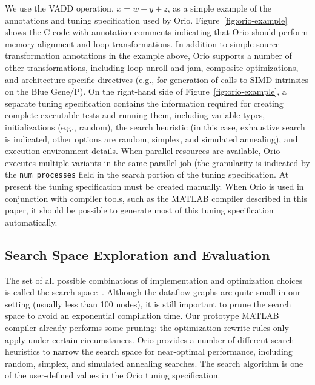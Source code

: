 \documentclass[11pt]{article}
\begin{document}
We use the VADD operation, $x = w + y + z$, as a simple example of the annotations and tuning specification used by Orio. Figure~\ref{fig:orio-example} shows the C code with annotation comments indicating that Orio should perform memory alignment and loop transformations. In addition to simple source transformation annotations in the example above, Orio supports a number of other transformations, including loop unroll and jam, composite optimizations, and architecture-specific directives (e.g., for generation of calls to SIMD intrinsics on the Blue Gene/P). On the right-hand side of Figure~\ref{fig:orio-example}, a separate tuning specification contains the information required for creating complete executable tests and running them, including variable types, initializations (e.g., random), the search heuristic (in this case, exhaustive search is indicated, other options are random, simplex, and simulated annealing), and execution environment details. When parallel resources are available, Orio executes multiple variants in the same parallel job (the granularity is indicated by the \texttt{num\_processes} field in the search portion of the tuning specification. At present the tuning specification must be created manually. When Orio is used in conjunction with compiler tools, such as the MATLAB compiler described in this paper, it should be possible to generate most of this tuning specification automatically.

\subsection{Search Space Exploration and Evaluation}
\label{sec:search}

The set of all possible combinations of implementation and optimization choices is called the search space~\cite{Kisuki:2000uq,Triantafyllis:2003uq, Cooper:2005kx}.  Although the dataflow graphs are quite small in our setting (usually less than 100 nodes), it is still important to prune the search space to avoid an exponential compilation time. Our prototype MATLAB compiler already performs some pruning: the optimization rewrite rules only apply under certain circumstances. 
%
%
Orio provides a number of different search heuristics to narrow the search space for near-optimal performance, including random, simplex, and simulated annealing searches. The search algorithm is one of the user-defined values in the Orio tuning specification.
\end{document}
